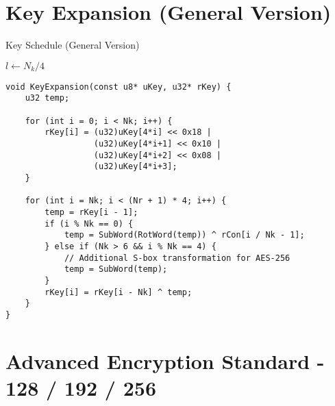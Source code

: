 \newpage
\section{Key Expansion (General Version)}
\begin{algorithm}[H]
	\caption{Key Schedule (General Version)}
	
	\BlankLine
	$l\gets N_k/4$
\end{algorithm}
\begin{lstlisting}[style=C, caption={Key Expansion (General ver.)},captionpos=t]
void KeyExpansion(const u8* uKey, u32* rKey) {
	u32 temp;
	
	for (int i = 0; i < Nk; i++) {
		rKey[i] = (u32)uKey[4*i] << 0x18 | 
				  (u32)uKey[4*i+1] << 0x10 | 
				  (u32)uKey[4*i+2] << 0x08 | 
				  (u32)uKey[4*i+3];
	}
	
	for (int i = Nk; i < (Nr + 1) * 4; i++) {
		temp = rKey[i - 1];
		if (i % Nk == 0) {
			temp = SubWord(RotWord(temp)) ^ rCon[i / Nk - 1];
		} else if (Nk > 6 && i % Nk == 4) {
			// Additional S-box transformation for AES-256
			temp = SubWord(temp);
		}
		rKey[i] = rKey[i - Nk] ^ temp;
	}
}
\end{lstlisting}

\newpage
\section{Advanced Encryption Standard - 128 / 192 / 256}

